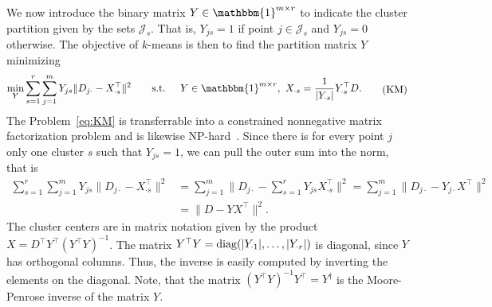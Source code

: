 We now introduce the binary matrix $Y\in\mathbbm{1}^{m\times r}$ to indicate the cluster partition given by the sets $\mathcal{J}_s$. That is, $Y_{js}=1$ if point $j\in \mathcal{J}_s$ and $Y_{js}=0$ otherwise. The objective of $k$-means is then to find the partition matrix $Y$ minimizing
\begin{equation}
\begin{aligned}
\min_Y &\sum_{s=1}^r\sum_{j=1}^mY_{js}\|D_{j\cdot}-X_{\cdot s}^\top\|^2\qquad
\text{s.t. } & Y\in \mathbbm{1}^{m\times r},\ X_{\cdot s} = \frac{1}{|Y_{\cdot s}|}Y_{\cdot s}^\top D. 
\end{aligned}
\tag{KM}\label{eq:KM}
\end{equation} 
The Problem~\eqref{eq:KM} is transferrable into a constrained nonnegative matrix factorization problem and is likewise NP-hard~\citep{aloise2009np}. Since there is for every point $j$ only one cluster $s$ such that $Y_{js}=1$, we can pull the outer sum into the norm, that is
\begin{align*}
\sum_{s=1}^r\sum_{j=1}^mY_{js}\|D_{j\cdot}-X_{\cdot s}^\top\|^2
&= \sum_{j=1}^m\|D_{j\cdot}-\sum_{s=1}^rY_{js}X_{\cdot s}^\top\|^2
= \sum_{j=1}^m\|D_{j\cdot}-Y_{j\cdot}X^\top\|^2\\
&=\|D-YX^\top\|^2.
\end{align*}
The cluster centers are in matrix notation given by the product $X=D^\top Y^\top (Y^\top Y)^{-1}$. 
The matrix $Y^\top Y=\operatorname{diag}(|Y_{\cdot 1}|,\ldots, |Y_{\cdot r}|)$ is diagonal, since $Y$ has orthogonal columns. Thus, the inverse is easily computed by inverting the elements on the diagonal. Note, that the matrix $(Y^\top Y)^{-1}Y^\top=Y^\dagger$ is the Moore-Penrose inverse of the matrix $Y$.


